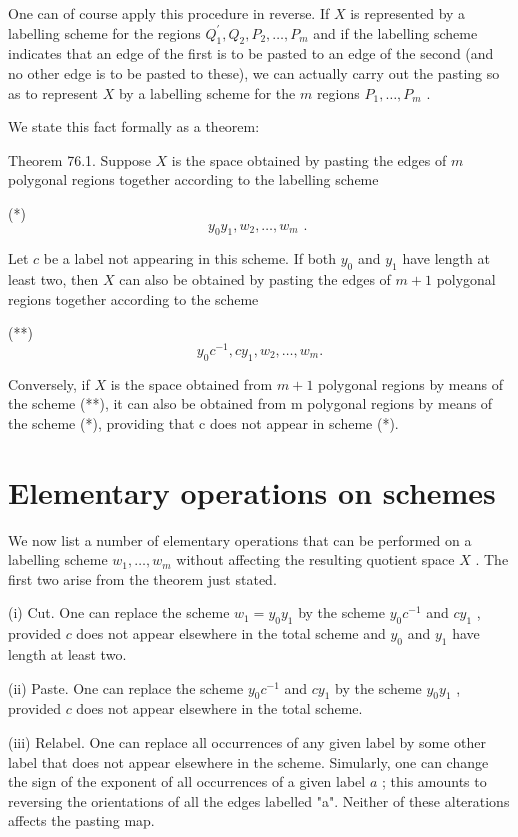 \documentclass[10pt]{article}
\begin{document}
One can of course apply this procedure in reverse. If \(X\) is represented by a labelling scheme for the regions \({Q}_{1}^{\prime },{Q}_{2},{P}_{2},\ldots ,{P}_{m}\) and if the labelling scheme indicates that an edge of the first is to be pasted to an edge of the second (and no other edge is to be pasted to these), we can actually carry out the pasting so as to represent \(X\) by a labelling scheme for the \(m\) regions \({P}_{1},\ldots ,{P}_{m}\) .

We state this fact formally as a theorem:

Theorem 76.1. Suppose \(X\) is the space obtained by pasting the edges of \(m\) polygonal regions together according to the labelling scheme

(*)
\[
{y}_{0}{y}_{1},{w}_{2},\ldots ,{w}_{m}\text{ . }
\]

Let \(c\) be a label not appearing in this scheme. If both \({y}_{0}\) and \({y}_{1}\) have length at least two, then \(X\) can also be obtained by pasting the edges of \(m + 1\) polygonal regions together according to the scheme

(**)
\[
{y}_{0}{c}^{-1},c{y}_{1},{w}_{2},\ldots ,{w}_{m}.
\]

Conversely, if \(X\) is the space obtained from \(m + 1\) polygonal regions by means of the scheme (**), it can also be obtained from m polygonal regions by means of the scheme (*), providing that c does not appear in scheme (*).

\section*{Elementary operations on schemes}

We now list a number of elementary operations that can be performed on a labelling scheme \({w}_{1},\ldots ,{w}_{m}\) without affecting the resulting quotient space \(X\) . The first two arise from the theorem just stated.

(i) Cut. One can replace the scheme \({w}_{1} = {y}_{0}{y}_{1}\) by the scheme \({y}_{0}{c}^{-1}\) and \(c{y}_{1}\) , provided \(c\) does not appear elsewhere in the total scheme and \({y}_{0}\) and \({y}_{1}\) have length at least two.

(ii) Paste. One can replace the scheme \({y}_{0}{c}^{-1}\) and \(c{y}_{1}\) by the scheme \({y}_{0}{y}_{1}\) , provided \(c\) does not appear elsewhere in the total scheme.

(iii) Relabel. One can replace all occurrences of any given label by some other label that does not appear elsewhere in the scheme. Simularly, one can change the sign of the exponent of all occurrences of a given label \(a\) ; this amounts to reversing the orientations of all the edges labelled "a". Neither of these alterations affects the pasting map.
\end{document}
